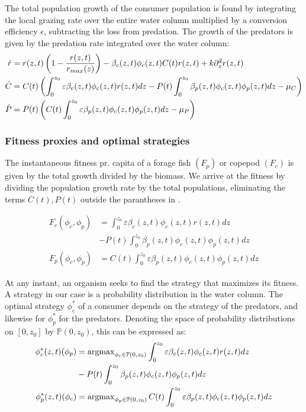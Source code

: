 The total population growth of the consumer population is found by integrating the local grazing rate over the entire water column multiplied by a conversion efficiency $\epsilon$, subtracting the loss from predation. The growth of the predators is given by the predation rate integrated over the water column:
\begin{align}
	\dot{r} &= r(z,t)\pa{1-\frac{r(z,t)}{r_{max}(z)}} - \beta_c(z,t)\phi_c(z,t)C(t) r(z,t)  + k \partial_z^2 r(z,t)\\
	\dot{C} &= C(t)\left ( \int_0^{z_0} \varepsilon \beta_c(z,t)\phi_c(z,t)r(z,t) dz- P(t)\int_0^{z_0} \beta_p(z,t) \phi_c(z,t) \phi_p(z,t) dz - \mu_C \right ) \\
	\dot{P} &= P(t) \left ( C(t )\int_0^{z_0} \varepsilon \beta_p(z,t) \phi_c(z,t)\phi_p(z,t) dz - \mu_P \right )
  \label{eq:population_growth_prob_dens}
\end{align}


\subsubsection*{Fitness proxies and optimal strategies}


The instantaneous fitness pr. capita of a forage fish $(F_p)$ or copepod $(F_c)$ is given by the total growth divided by the biomass. We arrive at the fitness by dividing the population growth rate  by the total populations, eliminating the terms $C(t), P(t)$ outside the parantheses in .

\begin{align}
	F_c(\phi_c, \phi_p) &= \int_0^{z_0} \varepsilon \beta_c(z,t)\phi_c(z,t)r(z,t) dz\\ &- P(t)\int_0^{z_0} \beta_p(z,t) \phi_c(z,t) \phi_p(z,t)dz \\
	F_p(\phi_c, \phi_p) &=  C(t) \int_0^{z_0} \varepsilon \beta_p(z,t)\phi_c(z,t)\phi_p(z,t) dz
  \label{eq:fitness}
\end{align}

At any instant, an organism seeks to find the strategy that maximizes its fitness. A strategy in our case is a probability distribution in the water column. The optimal strategy $\phi_c^*$ of a consumer depends on the strategy of the predators, and likewise for $\phi_p^*$ for the predators. Denoting the space of probability distributions on $[0,z_0]$ by $\mathbb{P}(0,z_0)$, this can be expressed as:
\begin{align*}
	\phi_c^*(z,t)(\phi_p) &= \argmax_{\phi_c \in \mathbb{P}(0,z_0)}  \int_0^{z_0} \varepsilon \beta_c(z,t)\phi_c(z,t)r(z,t) dz \\ &- P(t)\int_0^{z_0} \beta_p(z,t) \phi_c(z,t) \phi_p(z,t)dz  \\
	\phi_p^*(z,t)(\phi_c) &= \argmax_{\phi_p \in \mathbb{P}(0,z_0)}C(t) \int_0^{z_0} \varepsilon \beta_p(z,t)\phi_c(z,t)\phi_p(z,t) dz
\end{align*}

